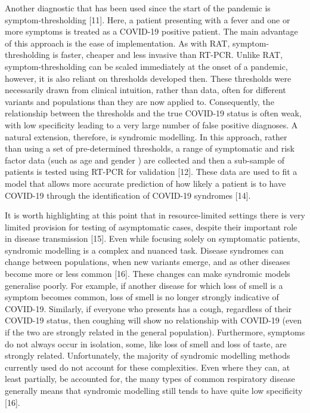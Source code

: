 \documentclass[]{elsarticle} %
\begin{document}
Another diagnostic that has been used since the start of the pandemic is symptom-thresholding {[}11{]}.
Here, a patient presenting with a fever and one or more symptoms is treated as a COVID-19 positive patient.
The main advantage of this approach is the ease of implementation.
As with RAT, symptom-thresholding is faster, cheaper and less invasive than RT-PCR.
Unlike RAT, symptom-thresholding can be scaled immediately at the onset of a pandemic, however, it is also reliant on thresholds developed then.
These thresholds were necessarily drawn from clinical intuition, rather than data, often for different variants and populations than they are now applied to.
Consequently, the relationship between the thresholds and the true COVID-19 status is often weak, with low specificity leading to a very large number of false positive diagnoses.
A natural extension, therefore, is syndromic modelling.
In this approach, rather than using a set of pre-determined thresholds, a range of symptomatic and risk factor data (such as age and gender ) are collected and then a sub-sample of patients is tested using RT-PCR for validation {[}12{]}.
These data are used to fit a model that allows more accurate prediction of how likely a patient is to have COVID-19 through the identification of COVID-19 syndromes {[}14{]}.

It is worth highlighting at this point that in resource-limited settings there is very limited provision for testing of asymptomatic cases, despite their important role in disease transmission {[}15{]}.
Even while focusing solely on symptomatic patients, syndromic modelling is a complex and nuanced task.
Disease syndromes can change between populations, when new variants emerge, and as other diseases become more or less common {[}16{]}.
These changes can make syndromic models generalise poorly.
For example, if another disease for which loss of smell is a symptom becomes common, loss of smell is no longer strongly indicative of COVID-19.
Similarly, if everyone who presents has a cough, regardless of their COVID-19 status, then coughing will show no relationship with COVID-19 (even if the two are strongly related in the general population).
Furthermore, symptoms do not always occur in isolation, some, like loss of smell and loss of taste, are strongly related.
Unfortunately, the majority of syndromic modelling methods currently used do not account for these complexities.
Even where they can, at least partially, be accounted for, the many types of common respiratory disease generally means that syndromic modelling still tends to have quite low specificity {[}16{]}.
\end{document}
